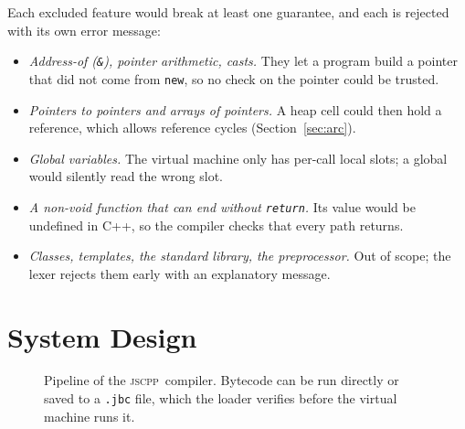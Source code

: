 \documentclass[conference]{IEEEtran}
\newcommand{\jscpp}{\textsc{jscpp}}
\begin{document}
Each excluded feature would break at least one guarantee, and each is rejected with its own error message:
\begin{itemize}
\item \emph{Address-of (\texttt{\&}), pointer arithmetic, casts.} They let a program build a pointer that did not
      come from \texttt{new}, so no check on the pointer could be trusted.
\item \emph{Pointers to pointers and arrays of pointers.} A heap cell could then hold a reference, which allows
      reference cycles (Section~\ref{sec:arc}).
\item \emph{Global variables.} The virtual machine only has per-call local slots; a global would silently read
      the wrong slot.
\item \emph{A non-void function that can end without \texttt{return}.} Its value would be undefined in C++, so
      the compiler checks that every path returns.
\item \emph{Classes, templates, the standard library, the preprocessor.} Out of scope; the lexer rejects them
      early with an explanatory message.
\end{itemize}

\section{System Design}
\label{sec:design}

\begin{figure}[t]
\centering
{}
\caption{Pipeline of the \jscpp\ compiler. Bytecode can be run directly or saved to a \texttt{.jbc} file, which the
loader verifies before the virtual machine runs it.}
\label{fig:pipeline}
\end{figure}
\end{document}
